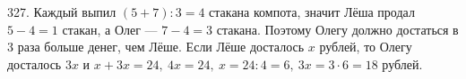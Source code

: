 327. Каждый выпил $(5+7):3=4$ стакана компота, значит Лёша продал $5-4=1$ стакан, а Олег --- $7-4=3$ стакана. Поэтому Олегу должно достаться в 3 раза больше денег, чем Лёше. Если Лёше досталось $x$ рублей, то Олегу досталось $3x$ и $x+3x=24,\ 4x=24,\ x=24:4=6,\ 3x=3\cdot6=18$ рублей.\\

